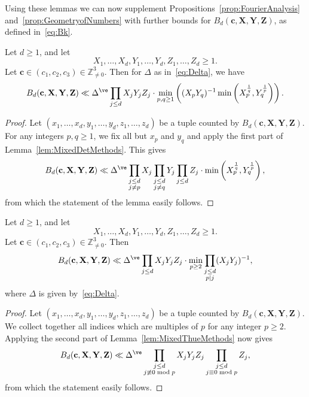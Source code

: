 Using these lemmas we can now supplement Propositions~\ref{prop:FourierAnalysis}
and~\ref{prop:GeometryofNumbers} with further bounds
for $B_d(\mathbf{c},\mathbf{X},\mathbf{Y},\mathbf{Z})$, as defined in~\eqref{eq:Bk}.


\begin{proposition}\label{prop:DeterminantMethod}
  Let $d\geq 1$, and let
  \[
  X_1,\ldots, X_d, Y_1,\ldots, Y_d,Z_1,\ldots, Z_d\geq 1.
  \]
  Let $\mathbf{c}\in (c_1,c_2,c_3)\in \mathbb{Z}_{\neq 0}^3$.
  Then for $\Delta$ as in~\eqref{eq:Delta}, we have
  \[
  B_d(\mathbf{c},\mathbf{X},\mathbf{Y},\mathbf{Z}) \ll
  \Delta^\ve \prod_{j\leq d} X_j Y_j Z_j \cdot
  \min_{p,q\geq 1}\left(
  (X_p Y_q)^{-1}
  \min\left( X_p^{\frac{1}{q}} , Y_q^{\frac{1}{p}}\right)\right).
  \]
\end{proposition}


\begin{proof}
  Let $(x_1,\ldots, x_d,y_1,\ldots, y_d,z_1,\ldots, z_d)$ be a tuple counted by $B_d(\mathbf{c},\mathbf{X},\mathbf{Y},\mathbf{Z})$.
  For any integers $p,q\geq 1$, we fix all but $x_p$ and $y_q$ and apply
  the first part of Lemma~\ref{lem:MixedDetMethods}. This gives
  \[
  B_d(\mathbf{c},\mathbf{X},\mathbf{Y},\mathbf{Z}) \ll
  \Delta^\ve \prod_{\substack{j\leq d\\ j\neq p }} X_j
  \prod_{\substack{j\leq d\\ j\neq q }} Y_j
  \prod_{\substack{j\leq d }} Z_j \cdot
  \min\left( X_p^{\frac{1}{q}} , Y_q^{\frac{1}{p}}\right) ,
  \]
  from which the statement of the lemma easily follows.
\end{proof}

\begin{proposition} \label{prop:ThueEquations}
  Let $d\geq 1$, and let
  \[
  X_1,\ldots, X_d, Y_1,\ldots, Y_d,Z_1,\ldots, Z_d\geq 1.
  \]
  Let $\mathbf{c}\in (c_1,c_2,c_3)\in \mathbb{Z}_{\neq 0}^3$.
  Then
  \[
  B_d(\mathbf{c},\mathbf{X},\mathbf{Y},\mathbf{Z}) \ll
  \Delta^\ve \prod_{j\leq d} X_j Y_j Z_j \cdot
  \min_{p\geq 2}
  \prod_{\substack{j\leq d \\ p\mid j}} (X_j Y_j)^{-1},
  \]
  where $\Delta$ is given by~\eqref{eq:Delta}.
\end{proposition}
\begin{proof}
  Let $(x_1,\ldots, x_d,y_1,\ldots, y_d,z_1,\ldots, z_d)$ be a tuple counted by $B_d(\mathbf{c},\mathbf{X},\mathbf{Y},\mathbf{Z})$.
  We collect together all indices which are multiples of $p$ for any integer $p\geq 2$.
  Applying the second part of Lemma~\ref{lem:MixedThueMethods} now gives
  \[
  B_d(\mathbf{c},\mathbf{X},\mathbf{Y},\mathbf{Z}) \ll
  \Delta^\ve \prod_{\substack{j\leq d\\ j\not\equiv 0 \bmod{p} }} X_j Y_j Z_j
  \prod_{\substack{j\leq d\\ j\equiv 0 \bmod{p} }} Z_j,
  \]
  from which the statement easily follows.
\end{proof}

